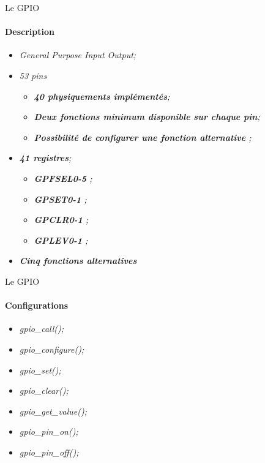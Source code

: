 \documentclass[french]{beamer}
\begin{document}
\begin{frame}{Le GPIO}
	\framesubtitle{Description}
	\begin{beamerboxesrounded}[scheme=blocgrisclair]{}
	\begin{center}
		\begin{itemize}
			\color{nb}
			\large
			\item<1-> \textit{General Purpose Input Output;}
			\item<2-> \textit{53 pins}
			\begin{itemize}
				\color{white}
				\item<3-> \textit{\textbf{40 physiquements implémentés};}
				\item<4-> \textit{\textbf{Deux fonctions minimum disponible sur chaque pin};}
				\item<5-> \textit{\textbf{Possibilité de configurer une fonction alternative} ;}
			\end{itemize}
			\item<6-> \textit{\textbf{41 registres};}
			\begin{itemize}
				\color{white}
				\item<7-> \textit{\textbf{GPFSEL{0-5}} ;}
				\item<8-> \textit{\textbf{GPSET{0-1}} ;}
				\item<9-> \textit{\textbf{GPCLR{0-1}} ;}
				\item<10-> \textit{\textbf{GPLEV{0-1}} ;}
			\end{itemize}
			\item<11-> \textit{\textbf{Cinq fonctions alternatives}}
		\end{itemize}
	\end{center}
\end{beamerboxesrounded}
\end{frame}

\begin{frame}{Le GPIO}
	\framesubtitle{Configurations}
	\begin{beamerboxesrounded}[scheme=blocgrisclair]{}
	\begin{center}
		\begin{itemize}
			\color{nb}
			\large
			\item<1-> \textit{gpio\_call();}
			\item<2-> \textit{gpio\_configure();}
			\item<3-> \textit{gpio\_set();}
			\item<4-> \textit{gpio\_clear();}
			\item<5-> \textit{gpio\_get\_value();}
			\item<6-> \textit{gpio\_pin\_on();}
			\item<7-> \textit{gpio\_pin\_off();}
		\end{itemize}
	\end{center}
\end{beamerboxesrounded}
\end{frame}
\end{document}
